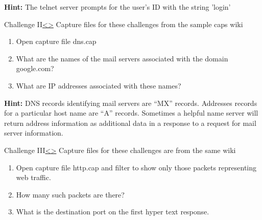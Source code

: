 \documentclass[12pt]{extarticle}
\newenvironment{instructionblock}{\Large\bgroup}{\egroup}
\begin{document}
\vspace{4mm}
\noindent
\textbf{Hint:} The telnet server prompts for the user's ID with the string 'login'





\pagebreak
\begin{slide}{Challenge II}{\hyperref[slide 23]{\textless}\hyperref[slide 25]{\textgreater}}
\vskip 5pt
\begin{instructionblock}
Capture files for these challenges from the sample caps wiki \cite{sampleCaps}
\begin{enumerate}
\item Open capture file dns.cap
\item What are the names of the mail servers associated with the domain google.com?
\item What are IP addresses associated with these names?
\end{enumerate}
\end{instructionblock}
\end{slide}

\vspace{4mm}
\noindent
\textbf{Hint:} DNS records identifying mail servers are ``MX'' records.  Addresses records for a particular host name are ``A'' records.  Sometimes a helpful name server will return address information as additional data in a response to a request for mail server information.




\pagebreak
\begin{slide}{Challenge III}{\hyperref[slide 24]{\textless}\hyperref[slide 26]{\textgreater}}
\vskip 5pt
\begin{instructionblock}
Capture files for these challenges are from the same wiki \cite{sampleCaps}
\begin{enumerate}
\item Open capture file http.cap and filter to show only those packets representing web traffic.
\item How many such packets are there?
\item What is the destination port on the first hyper text response.
\end{enumerate}
\end{instructionblock}
\end{slide}
\end{document}
